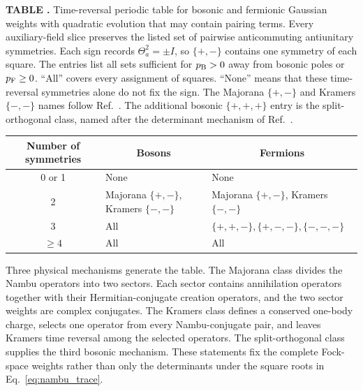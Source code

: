 \documentclass[onecolumn,aps,prb,amsmath,amssymb,superscriptaddress,longbibliography]{revtex4-2}
\begin{document}
\begin{center}
    \label{tab:periodic_table}
    \begin{minipage}{0.96\linewidth}
    \small
    \textbf{TABLE \thetable.}\enspace
    Time-reversal periodic table for bosonic and fermionic Gaussian weights with quadratic evolution that may contain pairing terms.  Every auxiliary-field slice preserves the listed set of pairwise anticommuting antiunitary symmetries.  Each sign records \(\Theta_a^2=\pm I\), so \(\{+,-\}\) contains one symmetry of each square.  The entries list all sets sufficient for \(p_{\rm B}>0\) away from bosonic poles or \(p_{\rm F}\geq0\).  ``All'' covers every assignment of squares.  ``None'' means that these time-reversal symmetries alone do not fix the sign.  The Majorana \(\{+,-\}\) and Kramers \(\{-,-\}\) names follow Ref.~\cite{li2016prl}.  The additional bosonic \(\{+,+,+\}\) entry is the split-orthogonal class, named after the determinant mechanism of Ref.~\cite{wang2015prl}.
    \par\vspace{0.7\baselineskip}
    \centering
    \begin{ruledtabular}
    \begin{tabular}{cll}
        Number of symmetries & \multicolumn{1}{c}{Bosons} & \multicolumn{1}{c}{Fermions} \\
        \hline
        0 or 1 & None & None \\
        2 & Majorana \(\{+,-\}\), Kramers \(\{-,-\}\)
          & Majorana \(\{+,-\}\), Kramers \(\{-,-\}\) \\
        3 & All
          & \(\{+,+,-\},\{+,-,-\},\{-,-,-\}\) \\
        \(\geq4\) & All & All
    \end{tabular}
    \end{ruledtabular}
    \end{minipage}
\end{center}

Three physical mechanisms generate the table.  The Majorana class divides the Nambu operators into two sectors.  Each sector contains annihilation operators together with their Hermitian-conjugate creation operators, and the two sector weights are complex conjugates.  The Kramers class defines a conserved one-body charge, selects one operator from every Nambu-conjugate pair, and leaves Kramers time reversal among the selected operators.  The split-orthogonal class supplies the third bosonic mechanism.  These statements fix the complete Fock-space weights rather than only the determinants under the square roots in Eq.~\eqref{eq:nambu_trace}.
\end{document}
